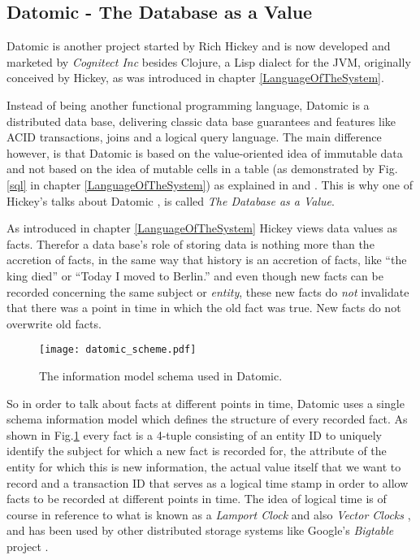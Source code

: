 \subsection{Datomic - The Database as a Value}
\label{datomic}

Datomic \cite{datomic} is another project started by Rich Hickey and is now
developed and marketed by \textit{Cognitect Inc} besides Clojure, a Lisp
dialect for the JVM, originally conceived by Hickey, as was introduced in
chapter \ref{LanguageOfTheSystem}.

Instead of being another functional programming language, Datomic
is a distributed data base, delivering classic data base guarantees and
features like ACID transactions, joins and a logical query language.
The main difference however, is that Datomic is based on the
value-oriented idea of immutable data and not based on the idea of
mutable cells in a table (as demonstrated by Fig.\ref{sql} in
chapter \ref{LanguageOfTheSystem}) as explained in
\cite{datomic-architecture} and \cite{datomic-datamodel}.
This is why one of Hickey's talks about Datomic \cite{datomic-talk1},
\cite{datomic-talk2} is called \textit{The Database as a Value}.

As introduced in chapter \ref{LanguageOfTheSystem} Hickey views
data values as facts. Therefor a data base's role of storing data
is nothing more than the accretion of facts, in the same way
that history is an accretion of facts, like ``the king died'' or
``Today I moved to Berlin.'' and even though new facts can be
recorded concerning the same subject or \textit{entity}, these
new facts do \textit{not} invalidate that there was a point in time
in which the old fact was true. New facts do not overwrite old facts.

\begin{figure}[h]
  \texttt{[image: datomic\_scheme.pdf]}
  \caption{The information model schema used in Datomic.}
  \label{datomic_schema}
\end{figure}

So in order to talk about facts at different points in time, Datomic
uses a single schema information model which defines the structure
of every recorded fact. As shown in Fig.\ref{datomic_schema} every
fact is a 4-tuple consisting of an entity ID to uniquely identify
the subject for which a new fact is recorded for, the attribute of
the entity for which this is new information, the actual value itself
that we want to record and a transaction ID that serves as a logical
time stamp in order to allow facts to be recorded at different points
in time. The idea of logical time is of course in reference to what is
known as a \textit{Lamport Clock} \cite{lamportclock} and also
\textit{Vector Clocks} \cite{vectorclock1}, \cite{vectorclock2}
and has been used by other distributed storage systems like
Google's \textit{Bigtable} project \cite{bigtable}.

